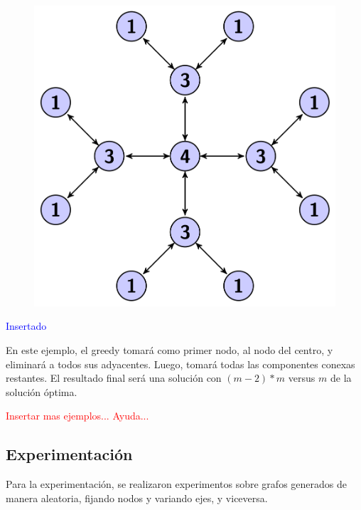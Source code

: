   \begin{figure}[h!]
   \begin{center}
 	\includegraphics[scale=0.4]{imagenes/maloGreedy.png}
	\label{GrafoCompleto}
   \end{center}
 \end{figure}

\textcolor{blue}{Insertado}

En este ejemplo, el greedy tomará como primer nodo, al nodo del centro, y eliminará a todos sus adyacentes. Luego, tomará todas las componentes conexas restantes.
El resultado final será una solución con $(m-2)*m$ versus $m$ de la solución óptima.

\textcolor{red}{Insertar mas ejemplos... Ayuda...}

\subsection{Experimentaci\'on}
Para la experimentación, se realizaron experimentos sobre grafos generados de manera aleatoria, fijando nodos y variando ejes, y viceversa.

